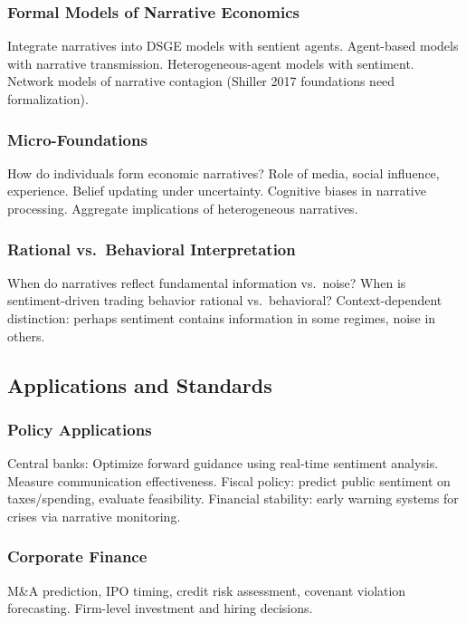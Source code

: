 \documentclass[12pt,a4paper]{article}
\begin{document}
\subsubsection{Formal Models of Narrative Economics}

Integrate narratives into DSGE models with sentient agents. Agent-based models with narrative transmission. Heterogeneous-agent models with sentiment. Network models of narrative contagion (Shiller 2017 foundations need formalization).

\subsubsection{Micro-Foundations}

How do individuals form economic narratives? Role of media, social influence, experience. Belief updating under uncertainty. Cognitive biases in narrative processing. Aggregate implications of heterogeneous narratives.

\subsubsection{Rational vs.\ Behavioral Interpretation}

When do narratives reflect fundamental information vs.\ noise? When is sentiment-driven trading behavior rational vs.\ behavioral? Context-dependent distinction: perhaps sentiment contains information in some regimes, noise in others.

\subsection{Applications and Standards}

\subsubsection{Policy Applications}

Central banks: Optimize forward guidance using real-time sentiment analysis. Measure communication effectiveness. Fiscal policy: predict public sentiment on taxes/spending, evaluate feasibility. Financial stability: early warning systems for crises via narrative monitoring.

\subsubsection{Corporate Finance}

M\&A prediction, IPO timing, credit risk assessment, covenant violation forecasting. Firm-level investment and hiring decisions.
\end{document}
